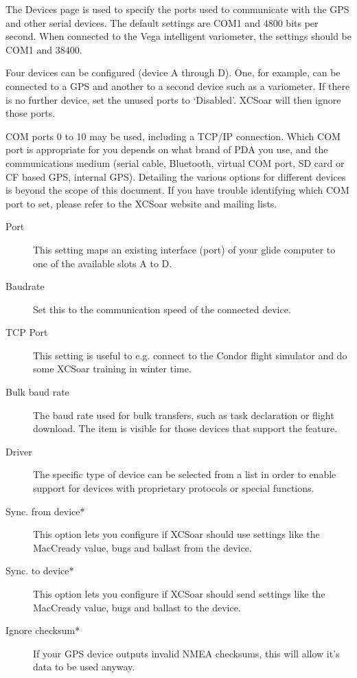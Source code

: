 The Devices page is used to specify the ports used to communicate with
the GPS and other serial devices. The default settings are COM1 and
4800 bits per second.  When connected to the Vega intelligent
variometer, the settings should be COM1 and 38400.

Four devices can be configured (device A through D). One, for
example, can be connected to a GPS and another to a
second device such as a variometer.  If there is no further device, 
set the unused ports to `Disabled'.  XCSoar will then ignore those ports.

COM ports 0 to 10 may be used, including a TCP/IP connection.  
Which COM port is appropriate for you
depends on what brand of PDA you use, and the communications medium
(serial cable, Bluetooth, virtual COM port, SD card or CF based GPS,
internal GPS).  Detailing the various options for different devices is
beyond the scope of this document.  If you have trouble identifying
which COM port to set, please refer to the XCSoar website and mailing
lists.

\begin{description}
\item[Port]  This setting maps an existing interface (port) of your 
  glide computer to one of the available slots A to D.
\item[Baudrate]  Set this to the communication speed of the connected device.
\item[TCP Port]  This setting is useful to e.g. connect to the Condor flight
  simulator and do some XCSoar training in winter time.
\item[Bulk baud rate]  The baud rate used for bulk transfers, such 
  as task declaration or flight download. The item is visible for those 
  devices that support the feature.
\item[Driver]  The specific type of device can be selected from a list in order
  to enable support for devices with proprietary protocols or special
  functions.
\item[Sync. from device*]  This option lets you configure if XCSoar should use settings 
  like the MacCready value, bugs and ballast from the device.
\item[Sync. to device*]  This option lets you configure if XCSoar should send settings 
  like the MacCready value, bugs and ballast to the device.
\item[Ignore checksum*] If your GPS device outputs invalid NMEA checksums, this 
  will allow it's data to be used anyway.
\end{description}

